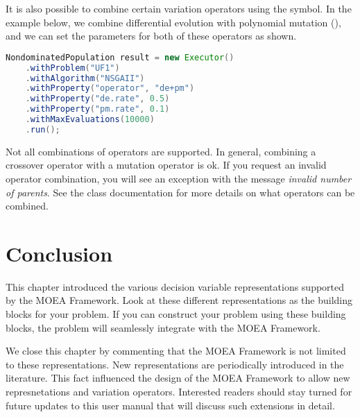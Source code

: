 It is also possible to combine certain variation operators using the \java{+} symbol.  In the example below, we combine differential evolution with polynomial mutation (), and we can set the parameters for both of these operators as shown.
\begin{lstlisting}[language=Java]
NondominatedPopulation result = new Executor()
    .withProblem("UF1")
    .withAlgorithm("NSGAII")
    .withProperty("operator", "de+pm")
    .withProperty("de.rate", 0.5)
    .withProperty("pm.rate", 0.1)
    .withMaxEvaluations(10000)
    .run();
\end{lstlisting}

\begin{important}
Not all combinations of operators are supported.  In general, combining a crossover operator with a mutation operator is ok.  If you request an invalid operator combination, you will see an exception with the message \emph{invalid number of parents}.  See the  class documentation for more details on what operators can be combined.
\end{important}

\section{Conclusion}
This chapter introduced the various decision variable representations supported by the MOEA Framework.  Look at these different representations as the building blocks for your problem.  If you can construct your problem using these building blocks, the problem will seamlessly integrate with the MOEA Framework.

We close this chapter by commenting that the MOEA Framework is not limited to these representations.  New representations are periodically introduced in the literature.  This fact influenced the design of the MOEA Framework to allow new represnetations and variation operators.  Interested readers should stay turned for future updates to this user manual that will discuss such extensions in detail.